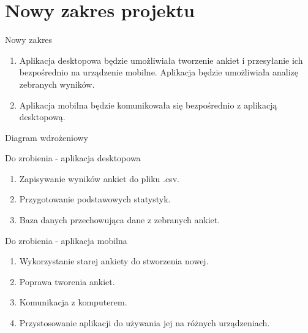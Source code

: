 \documentclass[a4paper,10pt]{beamer}
\begin{document}
		\section{Nowy zakres projektu}
			\begin{frame}{Nowy zakres}
				\begin{enumerate}
					\item Aplikacja desktopowa będzie umożliwiała tworzenie ankiet i przesyłanie ich bezpośrednio na urządzenie mobilne. Aplikacja będzie umożliwiała analizę zebranych wyników.
					\item Aplikacja mobilna będzie komunikowała się bezpośrednio z aplikacją desktopową.	
				\end{enumerate}
			\end{frame}
			\begin{frame}{Diagram wdrożeniowy}
			\end{frame}
			\begin{frame}{Do zrobienia - aplikacja desktopowa}
				\begin{enumerate}
					\item Zapisywanie wyników ankiet do pliku .csv. 
					\item Przygotowanie podstawowych statystyk.
					\item Baza danych przechowująca dane z zebranych ankiet.	
				\end{enumerate}
			\end{frame}
			\begin{frame}{Do zrobienia - aplikacja mobilna}
				\begin{enumerate}
					\item Wykorzystanie starej ankiety do stworzenia nowej.
					\item Poprawa tworenia ankiet.
					\item Komunikacja z komputerem.
					\item Przystosowanie aplikacji do używania jej na różnych urządzeniach.
				\end{enumerate}
			\end{frame}
\end{document}

